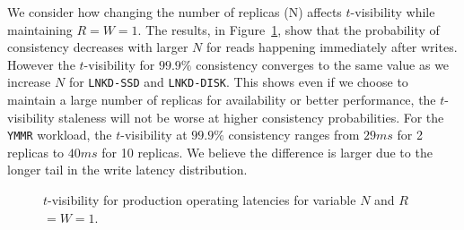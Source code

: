 \documentclass{vldb}
\begin{document}
We consider how changing the number of replicas (N) affects
$t$-visibility while maintaining $R$$=$$W$$=$$1$. The results, in
Figure~\ref{fig:varyn}, show that the probability of consistency
decreases with larger $N$ for reads happening immediately after writes. 
However the $t$-visibility for $99.9\%$ consistency converges to the
same value as we increase $N$ for \texttt{LNKD-SSD} and
\texttt{LNKD-DISK}. This shows even if we choose to maintain a 
large number of replicas for availability or better performance, the
$t$-visibility staleness will not be worse at higher consistency
probabilities. For the \texttt{YMMR} workload, the $t$-visibility at 
$99.9\%$ consistency ranges from $29ms$ for 2 replicas to $40ms$ for 10
replicas. We believe the difference is larger due to the longer tail
in the write latency distribution.

\begin{figure}
\centering
{}
\caption{$t$-visibility for production operating latencies for variable $N$ and $R$$=$$W$$=$$1$.}
\label{fig:varyn}
\end{figure}
\end{document}
